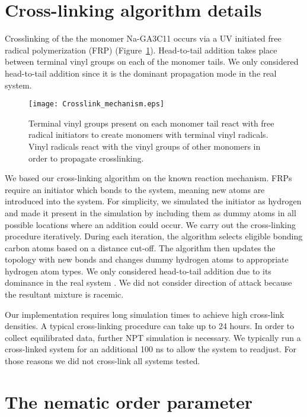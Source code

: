   \section{Cross-linking algorithm details}\label{S-section:xlink}

  Crosslinking of the the monomer Na-GA3C11 occurs via a UV initiated free
  radical polymerization (FRP) (Figure~\ref{S-fig:xlink_mech}). Head-to-tail addition
  takes place between terminal vinyl groups on each of the monomer tails. We
  only considered head-to-tail addition since it is the dominant propagation mode
  in the real system.   

  \begin{figure}[!htb]
  \centering
  \texttt{[image: Crosslink\_mechanism.eps]}
  \caption{Terminal vinyl groups present on each monomer tail react with free
	  radical initiators to create monomers with terminal vinyl radicals.  Vinyl
	  radicals react with the vinyl groups of other monomers in order to propagate
	  crosslinking.}\label{S-fig:xlink_mech}
  \end{figure}
  
  We based our cross-linking algorithm on the known reaction mechanism.
  FRPs require an initiator which bonds to the system, meaning new atoms are
  introduced into the system. For simplicity, we simulated the initiator as
  hydrogen and made it present in the simulation by including them as dummy atoms
  in all possible locations where an addition could occur. We carry out the
  cross-linking procedure iteratively. During each iteration, the algorithm
  selects eligible bonding carbon atoms based on a distance cut-off. The algorithm
  then updates the topology with new bonds and changes dummy hydrogen atoms to appropriate
  hydrogen atom types. We only considered head-to-tail addition
  due to its dominance in the real system \cite{young_introduction_2011}. We did
  not consider direction of attack because the resultant mixture is racemic.

  Our implementation requires long simulation times to achieve high cross-link 
  densities. A typical cross-linking procedure can take up to 24 hours. In
  order to collect equilibrated data, further NPT simulation is necessary. We
  typically run a cross-linked system for an additional 100 ns to allow the system
  to readjust. For those reasons we did not cross-link all systems tested.
  
  \clearpage
  \section{The nematic order parameter}\label{S-method:nematic_order}

